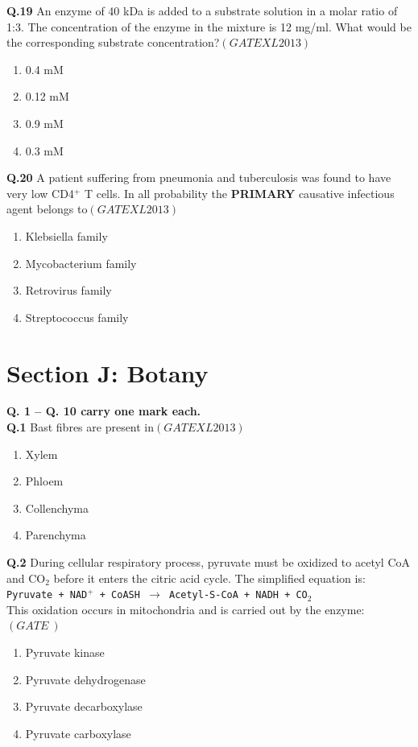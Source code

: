 \documentclass[12pt]{article}
\theoremstyle{remark}
\providecommand{\brak}[1]{\ensuremath{\left(#1\right)}}
\begin{document}
\textbf{Q.19} An enzyme of 40 kDa is added to a substrate solution in a molar ratio of 1:3. The concentration of the enzyme in the mixture is 12 mg/ml. What would be the corresponding substrate concentration?\hfill  \textit{\brak{GATE XL 2013}}
\begin{enumerate}
    \item 0.4 mM
    \item 0.12 mM
    \item 0.9 mM
    \item 0.3 mM
\end{enumerate}

\textbf{Q.20} A patient suffering from pneumonia and tuberculosis was found to have very low CD4$^+$ T cells. In all probability the \textbf{PRIMARY} causative infectious agent belongs to\hfill  \textit{\brak{GATE XL 2013}}
\begin{enumerate}
    \item Klebsiella family
    \item Mycobacterium family
    \item Retrovirus family
    \item Streptococcus family
\end{enumerate}

\clearpage
\section*{Section J: Botany}

\noindent\textbf{Q. 1 – Q. 10 carry one mark each.}\\

\textbf{Q.1} Bast fibres are present in\hfill  \textit{\brak{GATE XL 2013}}
\begin{enumerate}
    \item Xylem
    \item Phloem
    \item Collenchyma
    \item Parenchyma
\end{enumerate}

\textbf{Q.2} During cellular respiratory process, pyruvate must be oxidized to acetyl CoA and CO$_2$ before it enters the citric acid cycle. The simplified equation is: \\
\texttt{Pyruvate + NAD$^+$ + CoASH $\rightarrow$ Acetyl-S-CoA + NADH + CO$_2$} \\
This oxidation occurs in mitochondria and is carried out by the enzyme:\hfill  \textit{\brak{GATE\ }}
\begin{enumerate}
    \item Pyruvate kinase
    \item Pyruvate dehydrogenase
    \item Pyruvate decarboxylase
    \item Pyruvate carboxylase
\end{enumerate}
\end{document}
